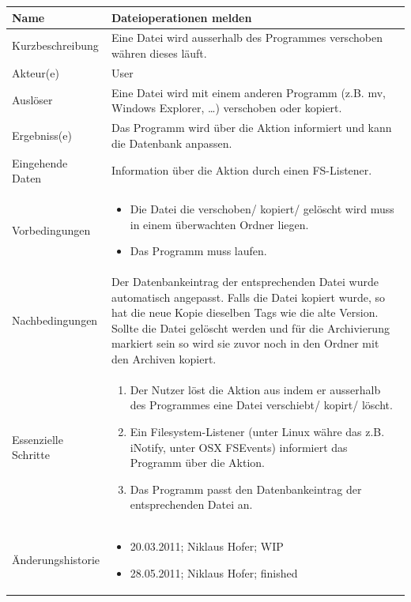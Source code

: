 \documentclass[10pt,paper=a4,final]{scrartcl}
\begin{document}
\begin{tabularx}{\textwidth}{|l|X|}
\hline
\bf Name		& {\bf Dateioperationen melden} \\ \hline
Kurzbeschreibung	& Eine Datei wird ausserhalb des Programmes verschoben währen dieses läuft. \\ \hline
Akteur(e)		& User \\ \hline
Ausl\"oser		& Eine Datei wird mit einem anderen Programm (z.B. mv, Windows Explorer, …) verschoben oder kopiert. \\ \hline
Ergebniss(e)		& Das Programm wird über die Aktion informiert und kann die Datenbank anpassen. \\ \hline
Eingehende Daten	& Information über die Aktion durch einen FS-Listener. \\ \hline
Vorbedingungen		& \begin{itemize}
  \item Die Datei die verschoben/ kopiert/ gelöscht wird muss in einem überwachten Ordner liegen.
  \item Das Programm muss laufen. \end{itemize} \\ \hline
Nachbedingungen		& Der Datenbankeintrag der entsprechenden Datei wurde automatisch angepasst.
Falls die Datei kopiert wurde, so hat die neue Kopie dieselben Tags wie die alte Version.
Sollte die Datei gelöscht werden und für die Archivierung markiert sein so wird sie zuvor noch in den Ordner mit den Archiven kopiert.\\ \hline
Essenzielle Schritte	& \begin{enumerate}
  \item Der Nutzer löst die Aktion aus indem er ausserhalb des Programmes eine Datei verschiebt/ kopirt/ löscht.
  \item Ein Filesystem-Listener (unter Linux währe das z.B. iNotify\cite{pyinotify}, \cite{inotify}  unter OSX FSEvents) informiert das Programm über die Aktion.
  \item Das Programm passt den Datenbankeintrag der entsprechenden Datei an. \end{enumerate} \\ \hline
\"Anderungshistorie	& \begin{itemize}
  \item 20.03.2011; Niklaus Hofer; WIP
  \item 28.05.2011; Niklaus Hofer; finished \end{itemize} \\ \hline
\end{tabularx}
\end{document}
